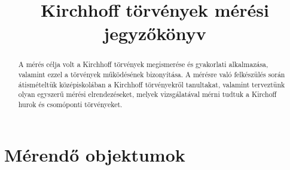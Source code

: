 \documentclass[10pt, conference,a4paper]{ITKproc}
\begin{document}
\title{Kirchhoff törvények mérési jegyzőkönyv}
\author{
}


\maketitle

\begin{abstract}
A mérés célja volt a Kirchhoff törvények megismerése és gyakorlati alkalmazása, valamint ezzel a törvények működésének bizonyítása. A mérésre való felkészülés során átismételtük középiskolában a Kirchhoff törvényekről tanultakat, valamint terveztünk olyan egyszerű mérési elrendezéseket, melyek vizsgálatával mérni tudtuk a Kirchoff hurok és csomóponti törvényeket. 
\end{abstract}

\IEEEpeerreviewmaketitle
\section{Mérendő objektumok}
\end{document}
